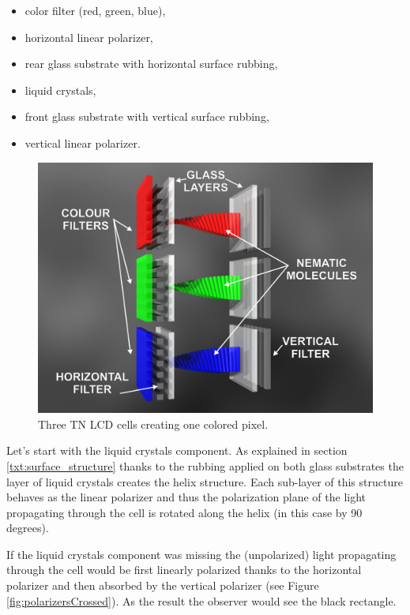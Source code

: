 \begin{itemize}
\item color filter (red, green, blue),
\item horizontal linear polarizer,
\item rear glass substrate with horizontal surface rubbing,
\item liquid crystals,
\item front glass substrate with vertical surface rubbing,
\item vertical linear polarizer. 
\end{itemize}

\begin{figure}[hbt]
\centering
\includegraphics[width=12cm]{img/tn_cell_wiki_en.jpg}
\caption{Three TN LCD cells creating one colored pixel. \cite{tnlcdsubpix}}
\label{fig:tnLcdcell}
\end{figure}

Let's start with the liquid crystals component. As explained in section \ref{txt:surface_structure} thanks to the rubbing applied on both glass substrates the layer of liquid crystals creates the helix structure. Each sub-layer of this structure behaves as the linear polarizer and thus the polarization plane of the light propagating through the cell is rotated along the helix (in this case by 90 degrees).

If the liquid crystals component was missing the (unpolarized) light propagating through the cell would be first linearly polarized thanks to the horizontal polarizer and then absorbed by the vertical polarizer (see Figure \ref{fig:polarizersCrossed}). As the result the observer would see the black rectangle.

